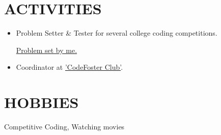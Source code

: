 \documentclass[line, margin]{res}
\begin{document}
\begin{resume}
\section{ACTIVITIES}
\begin{itemize}
\item Problem Setter \& Tester for several college coding competitions.

\href{https://drive.google.com/open?id=150YyyLzaqZVhkNDS19aG1i4u6s5tZCS1n3GMEuXRi1M}{Problem set by me.}
\item Coordinator at \href{http://codefoster.club/}{'CodeFoster Club'}.
\end{itemize}

\section{HOBBIES}
Competitive Coding, Watching movies

\end{resume}
\end{document}
